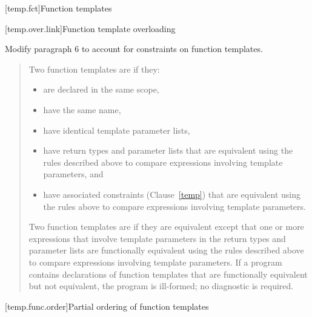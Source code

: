 [temp.fct]{Function templates}

[temp.over.link]{Function template overloading}

Modify paragraph 6 to account for constraints on function templates.

\begin{quote}
\setcounter{Paras}{5}
\pnum

% 
\begin{addedblock}
Two function templates are  if they:
\begin{itemize}
\item are declared in the same scope,

\item have the same name,

\item have identical template parameter lists,

\item have return types and parameter lists that are equivalent using the 
rules described above to compare expressions involving template parameters, and

\item have associated constraints (Clause~\ref{temp}) that are equivalent 
using the rules above to compare expressions involving template parameters.
\end{itemize}
\end{addedblock}
% 
Two function templates are  if they 
are equivalent except that one or more expressions that involve 
template parameters in the return types and parameter lists are functionally equivalent using 
the rules described above to compare expressions involving template parameters.
% 
If a program contains declarations of function templates that are 
functionally equivalent but not equivalent, the program is ill-formed; 
no diagnostic is required.
\end{quote}


[temp.func.order]{Partial ordering of function templates}

